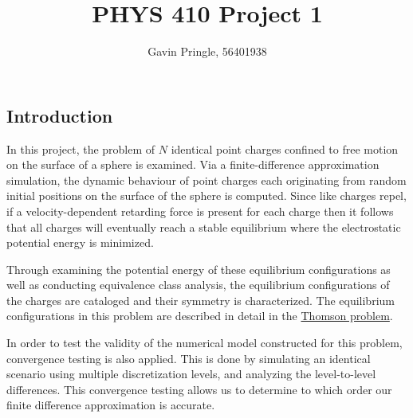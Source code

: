 \documentclass[10pt]{article}
\title{PHYS 410 Project 1}
\author{Gavin Pringle, 56401938}
\begin{document}
\maketitle


\subsection*{Introduction}

In this project, the problem of $N$ identical point charges confined to free motion on the surface of a 
sphere is examined. Via a finite-difference approximation simulation, the dynamic behaviour of point 
charges each originating from random initial positions on the surface of the sphere is computed. 
Since like charges repel, if a velocity-dependent retarding force is present for each charge then it 
follows that all charges will eventually reach a stable equilibrium where the electrostatic potential
energy is minimized. 
 
Through examining the potential energy of these equilibrium configurations as well as conducting 
equivalence class analysis, the equilibrium configurations of the charges are cataloged and their
symmetry is characterized. The equilibrium configurations in this problem are described in detail 
in the \href{https://en.wikipedia.org/wiki/Thomson_problem}{Thomson problem}.

In order to test the validity of the numerical model constructed for this problem, convergence testing 
is also applied. This is done by simulating an identical scenario using multiple discretization levels,
and analyzing the level-to-level differences. This convergence testing allows us to determine to which
order our finite difference approximation is accurate.
\end{document}
